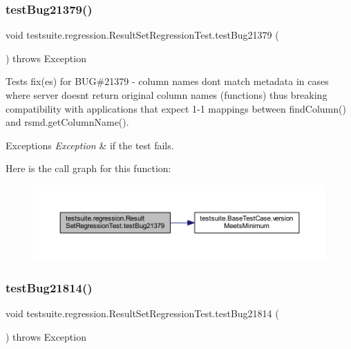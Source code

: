 \subsubsection{\texorpdfstring{test\+Bug21379()}{testBug21379()}}
{\footnotesize\ttfamily void testsuite.\+regression.\+Result\+Set\+Regression\+Test.\+test\+Bug21379 (\begin{DoxyParamCaption}{ }\end{DoxyParamCaption}) throws Exception}

Tests fix(es) for B\+UG\#21379 -\/ column names don\textquotesingle{}t match metadata in cases where server doesn\textquotesingle{}t return original column names (functions) thus breaking compatibility with applications that expect 1-\/1 mappings between find\+Column() and rsmd.\+get\+Column\+Name().


\begin{DoxyExceptions}{Exceptions}
{\em Exception} & if the test fails. \\
\hline
\end{DoxyExceptions}
Here is the call graph for this function\+:
\nopagebreak
\begin{figure}[H]
\begin{center}
\leavevmode
\includegraphics[width=350pt]{classtestsuite_1_1regression_1_1_result_set_regression_test_a0e70ddab19727d4cb909e12706e43cff_cgraph}
\end{center}
\end{figure}
\mbox{\label{classtestsuite_1_1regression_1_1_result_set_regression_test_a13c63c3fff5de437e9d908260d7edff8}} 
\subsubsection{\texorpdfstring{test\+Bug21814()}{testBug21814()}}
{\footnotesize\ttfamily void testsuite.\+regression.\+Result\+Set\+Regression\+Test.\+test\+Bug21814 (\begin{DoxyParamCaption}{ }\end{DoxyParamCaption}) throws Exception}

